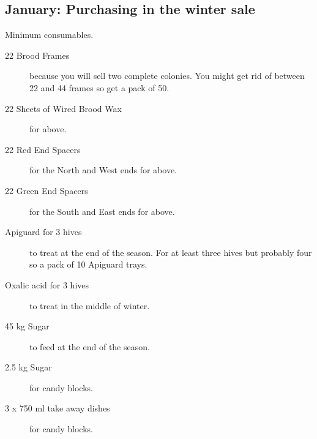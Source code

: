 \subsection{January: Purchasing in the winter sale}

Minimum consumables.

\begin{description}
    \item[22 Brood Frames] because you will sell two complete colonies.
      You might get rid of between 22 and 44 frames so get a pack of 50.
    \item[22 Sheets of Wired Brood Wax] for above.
    \item[22 Red End Spacers] for the North and West ends for above.
    \item[22 Green End Spacers] for the South and East ends for above.
    \item[Apiguard for 3 hives] to treat at the end of the season.
      For at least three hives but probably four so a pack of 10 Apiguard trays.
    \item[Oxalic acid for 3 hives] to treat in the middle of winter.
    \item[45 kg Sugar] to feed at the end of the season.
    \item[2.5 kg Sugar] for candy blocks.
    \item[3 x 750 ml take away dishes] for candy blocks.
\end{description}

